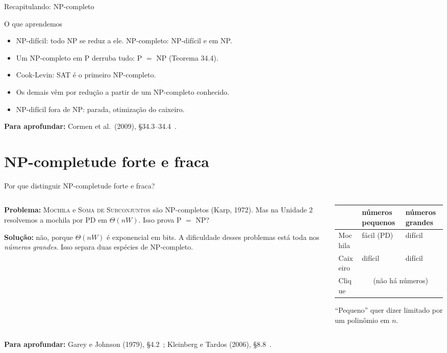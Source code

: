 \documentclass[aspectratio=169,xcolor=table]{beamer}
\newcommand{\fonte}[1]{%
  \vfill
  {\tiny\color{gray!55!black}\textbf{Para aprofundar:} #1\par}%
}
\newcommand{\prob}[1]{\textsc{#1}}
\begin{document}
\begin{frame}{Recapitulando: NP-completo}
  \begin{block}{O que aprendemos}
    \begin{itemize}
      \item NP-difícil: todo NP se reduz a ele. NP-completo: NP-difícil e em NP.
      \item Um NP-completo em P derruba tudo: P $=$ NP (Teorema 34.4).
      \item Cook-Levin: \prob{SAT} é o primeiro NP-completo.
      \item Os demais vêm por redução a partir de um NP-completo conhecido.
      \item NP-difícil fora de NP: parada, otimização do caixeiro.
    \end{itemize}
  \end{block}
  \fonte{Cormen et al.\ (2009), \S 34.3--34.4~\cite{cormen2009introduction}.}
\end{frame}

\section{NP-completude forte e fraca}

\begin{frame}{Por que distinguir NP-completude forte e fraca?}
  \begin{columns}[T]
    \begin{column}{0.44\textwidth}
      \small
      \textbf{Problema:} \prob{Mochila} e \prob{Soma de Subconjuntos} são NP-completos
      (Karp, 1972). Mas na Unidade 2 resolvemos a mochila por PD em $\Theta(nW)$. Isso
      prova P $=$ NP?
      \medskip

      {\scriptsize\textbf{Solução:} não, porque $\Theta(nW)$ é exponencial em bits. A
      dificuldade desses problemas está toda nos \emph{números grandes}. Isso separa duas
      espécies de NP-completo.\par}
    \end{column}
    \begin{column}{0.52\textwidth}
      \scriptsize
      \centering
      \begin{tabular}{lll}
        \toprule
        & números pequenos & números grandes \\
        \midrule
        Mochila & fácil (PD) & difícil \\
        Caixeiro & difícil & difícil \\
        Clique & \multicolumn{2}{c}{(não há números)} \\
        \bottomrule
      \end{tabular}
      \medskip

      \raggedright
      ``Pequeno'' quer dizer limitado por um polinômio em $n$.
    \end{column}
  \end{columns}
  \fonte{Garey e Johnson (1979), \S 4.2~\cite{garey1979computers};
    Kleinberg e Tardos (2006), \S 8.8~\cite{kleinberg2006algorithm}.}
\end{frame}
\end{document}
